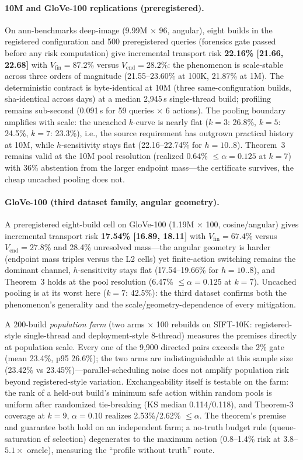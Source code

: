 \documentclass{article}
\begin{document}
\paragraph{10M and GloVe-100 replications (preregistered).}
On ann-benchmarks deep-image (9.99M $\times$ 96, angular), eight builds in the registered
configuration and 500 preregistered queries (forensics gate passed before any risk
computation) give incremental transport risk \textbf{22.16\% [21.66, 22.68]} with
$V_{\mathrm{fin}}{=}87.2\%$ versus $V_{\mathrm{end}}{=}28.2\%$: the phenomenon is
scale-stable across three orders of magnitude (21.55--23.60\% at 100K, 21.87\% at 1M).
The deterministic contract is byte-identical at 10M (three same-configuration builds,
sha-identical across days) at a median 2{,}945\,s single-thread build; profiling remains
sub-second (0.091\,s for 59 queries $\times$ 6 actions). The pooling boundary amplifies
with scale: the uncached $k$-curve is nearly flat ($k{=}3$: 26.8\%, $k{=}5$: 24.5\%, $k{=}7$:
23.3\%), i.e., the source requirement has outgrown practical history at 10M, while
$h$-sensitivity stays flat (22.16--22.74\% for $h{=}10{..}8$). Theorem~3 remains valid at the 10M
pool resolution (realized 0.64\% $\le\alpha{=}0.125$ at $k{=}7$) with 36\% abstention from the
larger endpoint mass---the certificate survives, the cheap uncached pooling does not.

\paragraph{GloVe-100 (third dataset family, angular geometry).}
A preregistered eight-build cell on GloVe-100 (1.19M $\times$ 100, cosine/angular) gives incremental
transport risk \textbf{17.54\% [16.89, 18.11]} with $V_{\mathrm{fin}}{=}67.4\%$ versus
$V_{\mathrm{end}}{=}27.8\%$ and 28.4\% unresolved mass---the angular geometry is harder (endpoint
mass triples versus the L2 cells) yet finite-action switching remains the dominant channel,
$h$-sensitivity stays flat (17.54--19.66\% for $h{=}10{..}8$), and Theorem~3 holds at the pool
resolution (6.47\% $\le\alpha{=}0.125$ at $k{=}7$). Uncached pooling is at its worst here
($k{=}7$: 42.5\%): the third dataset confirms both the phenomenon's generality and the
scale/geometry-dependence of every mitigation.

A 200-build \emph{population farm} (two arms $\times$ 100 rebuilds on SIFT-10K: registered-style
single-thread and deployment-style 8-thread) measures the premises directly at population scale. Every one
of the 9{,}900 directed pairs exceeds the 2\% gate (mean 23.4\%, p95 26.6\%); the two arms are
indistinguishable at this sample size (23.42\% vs 23.45\%)---parallel-scheduling noise does not amplify population risk
beyond registered-style variation. Exchangeability itself is testable on the farm: the rank of a held-out
build's minimum safe action within random pools is uniform after randomized tie-breaking (KS median
0.114/0.118), and Theorem-3 coverage at $k{=}9$, $\alpha{=}0.10$ realizes 2.53\%/2.62\% $\le\alpha$.
The theorem's premise and guarantee both hold on an independent farm; a no-truth budget rule (queue-
saturation ef selection) degenerates to the maximum action (0.8--1.4\% risk at $3.8$--$5.1\times$ oracle),
measuring the ``profile without truth'' route.
\end{document}
